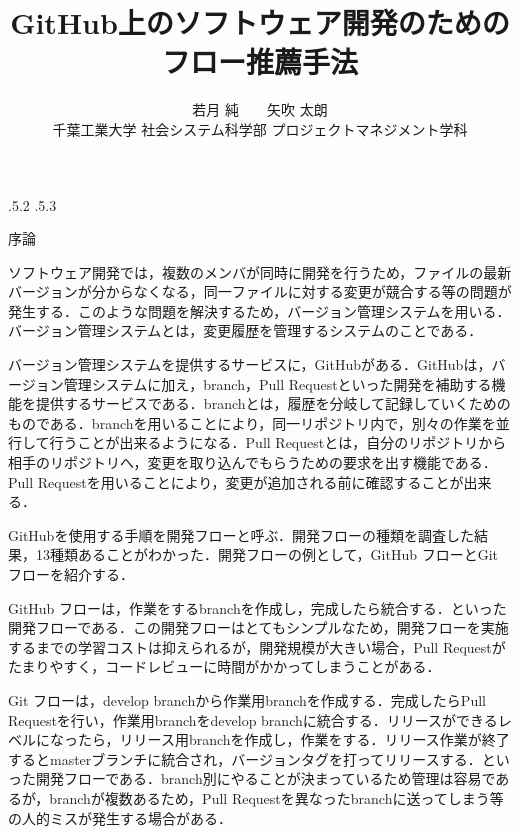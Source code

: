 \documentclass[uplatex,twocolumn]{jsarticle}
\title{\vspace{-14mm}GitHub上のソフトウェア開発のためのフロー推薦手法 \footnotemark[0]}
\author{若月 純\footnotemark[2]　　矢吹 太朗\\ 千葉工業大学 社会システム科学部 プロジェクトマネジメント学科\footnotemark[3]}
\date{}%
\makeatletter
\renewcommand{\section}{%
    \if@slide\clearpage\fi
    \@startsection{section}{1}{\z@}%
    {\Cvs \@plus.5\Cdp \@minus.2\Cdp}%
    {.5\Cvs \@plus.3\Cdp}%
    {\normalfont\raggedright}}
\makeatother
\begin{document}
\twocolumn[
	\maketitle
]
\begingroup
\def\thefootnote{\fnsymbol{footnote}}
\endgroup

\section{序論}

ソフトウェア開発では，複数のメンバが同時に開発を行うため，ファイルの最新バージョンが分からなくなる，同一ファイルに対する変更が競合する等の問題が発生する．このような問題を解決するため，バージョン管理システムを用いる．バージョン管理システムとは，変更履歴を管理するシステムのことである\cite{ikeda2014}．

バージョン管理システムを提供するサービスに，GitHubがある．GitHubは，バージョン管理システムに加え，branch，Pull Requestといった開発を補助する機能を提供するサービスである．branchとは，履歴を分岐して記録していくためのものである．branchを用いることにより，同一リポジトリ内で，別々の作業を並行して行うことが出来るようになる．Pull Requestとは，自分のリポジトリから相手のリポジトリへ，変更を取り込んでもらうための要求を出す機能である．Pull Requestを用いることにより，変更が追加される前に確認することが出来る．

GitHubを使用する手順を開発フローと呼ぶ．開発フローの種類を調査した結果，13種類あることがわかった．開発フローの例として，GitHub フローとGit フローを紹介する．

GitHub フローは，作業をするbranchを作成し，完成したら統合する．といった開発フローである．この開発フローはとてもシンプルなため，開発フローを実施するまでの学習コストは抑えられるが，開発規模が大きい場合，Pull Requestがたまりやすく，コードレビューに時間がかかってしまうことがある．

Git フローは，develop branchから作業用branchを作成する．完成したらPull Requestを行い，作業用branchをdevelop branchに統合する．リリースができるレベルになったら，リリース用branchを作成し，作業をする．リリース作業が終了するとmasterブランチに統合され，バージョンタグを打ってリリースする．といった開発フローである．branch別にやることが決まっているため管理は容易であるが，branchが複数あるため，Pull Requestを異なったbranchに送ってしまう等の人的ミスが発生する場合がある\cite{ohtsuka2014}．
\end{document}
